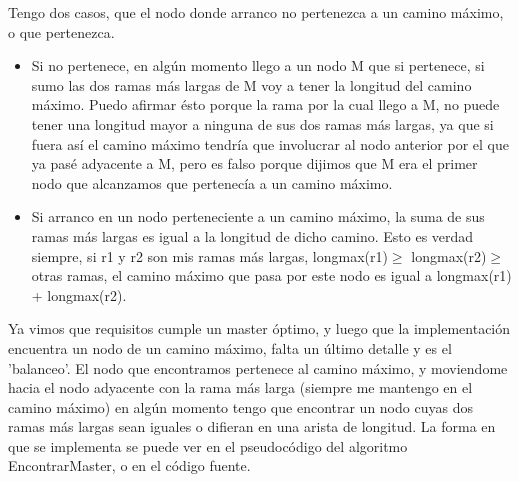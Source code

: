 Tengo dos casos, que el nodo donde arranco no pertenezca a un camino máximo, o que pertenezca.
\begin{itemize}

\item Si no pertenece, en algún momento llego a un nodo M que si pertenece, si sumo las dos ramas más largas de M voy a tener la longitud del camino máximo. Puedo afirmar ésto porque la rama por la cual llego a M, no puede tener una longitud mayor a ninguna de sus dos ramas más largas, ya que si fuera así el camino máximo tendría que involucrar al nodo anterior por el que ya pasé adyacente a M, pero es falso porque dijimos que M era el primer nodo que alcanzamos que pertenecía a un camino máximo.

\item Si arranco en un nodo perteneciente a un camino máximo, la suma de sus ramas más largas es igual a la longitud de dicho camino. Esto es verdad siempre, si r1 y r2 son mis ramas más largas, longmax(r1)$\geq$ longmax(r2)$\geq$ otras ramas, el camino máximo que pasa por este nodo es igual a longmax(r1) + longmax(r2).
\end{itemize}

Ya vimos que requisitos cumple un master óptimo, y luego que la implementación encuentra un nodo de un camino máximo, falta un último detalle y es el 'balanceo'.
El nodo que encontramos pertenece al camino máximo, y moviendome hacia el nodo adyacente con la rama más larga (siempre me mantengo en el camino máximo) en algún momento tengo que encontrar un nodo cuyas dos ramas más largas sean iguales o difieran en una arista de longitud. La forma en que se implementa se puede ver en el pseudocódigo del algoritmo EncontrarMaster, o en el código fuente.


